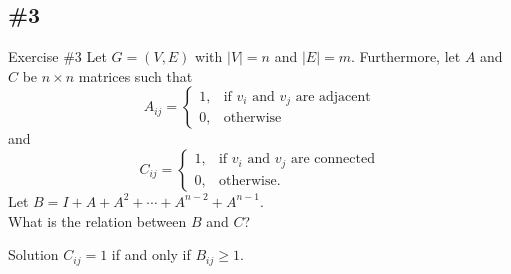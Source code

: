\documentclass{beamer}
\begin{document}
\subsection{\#3}
\begin{frame}{Exercise \#3}
  Let $G = (V, E)$ with $|V| = n$ and $|E| = m$. \pause
  Furthermore, let $A$ and $C$ be $n \times n$ matrices such that
  \begin{equation*}
    A_{ij} =
    \begin{cases}
      1, & \text{if $v_i$ and $v_j$ are adjacent} \\
      0, & \text{otherwise}
    \end{cases}
  \end{equation*}
  and
  \begin{equation*}
    C_{ij} =
    \begin{cases}
      1, & \text{if $v_i$ and $v_j$ are connected} \\
      0, & \text{otherwise}.
    \end{cases}
  \end{equation*}
  \pause
  Let $B = I + A + A^2 + \cdots + A^{n-2} + A^{n-1}$. \\
  What is the relation between $B$ and $C$? \pause
  \begin{block}{Solution}
    $C_{ij} = 1$ if and only if $B_{ij} \geq 1$.
  \end{block}
\end{frame}
\end{document}
